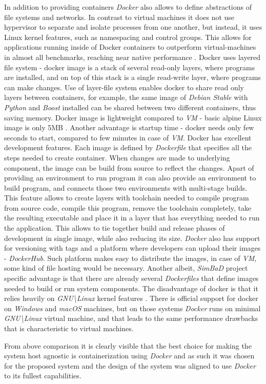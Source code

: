 In addition to providing containers \textit{Docker} also allows to define abstractions of file systems and networks. In contrast to virtual machines it does not use hypervisor to separate and isolate processes from one another, but instead, it uses Linux kernel features, such as namespacing and control groups. This allows for applications running inside of Docker containers to outperform virtual-machines in almost all benchmarks, reaching near native performance \cite{Felter2015}. Docker uses layered file system - docker image is a stack of several read-only layers, where programs are installed, and on top of this stack is a single read-write layer, where programs can make changes. Use of layer-file system enables docker to share read only layers between containers, for example, the same image of \textit{Debian Stable} with \textit{Python} and \textit{Boost} installed can be shared between two different containers, thus saving memory. Docker image is lightweight compared to \textit{VM} - basic alpine Linux image is only 5MB \cite{Alpine}. Another advantage is startup time - docker needs only few seconds to start, compared to few minutes in case of \textit{VM}. 
Docker has excellent development features. Each image is defined by \textit{Dockerfile} that specifies all the steps needed to create container. When changes are made to underlying component, the image can be build from source to reflect the changes. Apart of providing an environment to run program it can also provide an environment to build program, and connects those two environments with multi-stage builds. This feature allows to create layers with toolchain needed to compile program from source code, compile this program, remove the toolchain completely, take the resulting executable and place it in a layer that has everything needed to run the application. This allows to tie together build and release phases of development in single image, while also reducing its size. \textit{Docker} also has support for versioning with tags and a platform where developers can upload their images - \textit{DockerHub}. Such platform makes easy to distribute the images, in case of \textit{VM}, some kind of file hosting would be necessary. Another albeit, \textit{SimBaD} project specific advantage is that there are already several \textit{Dockerfiles} that define images needed to build or run system components.
The disadvantage of docker is that it relies heavily on \textit{GNU\textbackslash Linux} kernel features \cite{DockerOverview}. There is official support for docker on \textit{Windows} and \textit{macOS} machines, but on those systems \textit{Docker} runs on minimal \textit{GNU\textbackslash Linux} virtual machine, and that leads to the same performance drawbacks that is characteristic to virtual machines. 

From above comparison it is clearly visible that the best choice for making the system host agnostic is containerization using \textit{Docker} and as such it was chosen for the proposed system and the design of the system was aligned to use \textit{Docker} to its fullest capabilities.

